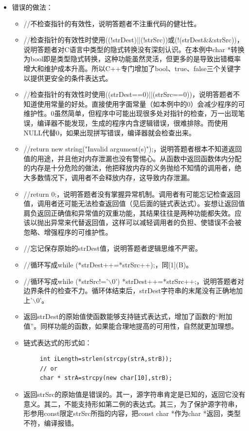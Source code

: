 \documentclass[9pt, b5paper]{article}
\begin{document}
\begin{itemize}
\item 错误的做法：
\begin{itemize}
\item //不检查指针的有效性，说明答题者不注重代码的健壮性。
\item //检查指针的有效性时使用((!strDest)||(!strSrc))或(!(strDest\&\&strSrc))，说明答题者对C语言中类型的隐式转换没有深刻认识。在本例中char *转换为bool即是类型隐式转换，这种功能虽然灵活，但更多的是导致出错概率增大和维护成本升高。所以C++专门增加了bool、true、false三个关键字以提供更安全的条件表达式。
\item //检查指针的有效性时使用((strDest==0)||(strSrc==0))，说明答题者不知道使用常量的好处。直接使用字面常量（如本例中的0）会减少程序的可维护性。0虽然简单，但程序中可能出现很多处对指针的检查，万一出现笔误，编译器不能发现，生成的程序内含逻辑错误，很难排除。而使用NULL代替0，如果出现拼写错误，编译器就会检查出来。
\item //return new string("Invalid argument(s)");，说明答题者根本不知道返回值的用途，并且他对内存泄漏也没有警惕心。从函数中返回函数体内分配的内存是十分危险的做法，他把释放内存的义务抛给不知情的调用者，绝大多数情况下，调用者不会释放内存，这导致内存泄漏。
\item //return 0;，说明答题者没有掌握异常机制。调用者有可能忘记检查返回值，调用者还可能无法检查返回值（见后面的链式表达式）。妄想让返回值肩负返回正确值和异常值的双重功能，其结果往往是两种功能都失效。应该以抛出异常来代替返回值，这样可以减轻调用者的负担、使错误不会被忽略、增强程序的可维护性。
\item //忘记保存原始的strDest值，说明答题者逻辑思维不严密。
\item //循环写成while (*strDest++=*strSrc++);，同[1](B)。
\item //循环写成while (*strSrc!='$\backslash$0') *strDest++=*strSrc++;，说明答题者对边界条件的检查不力。循环体结束后，strDest字符串的末尾没有正确地加上'$\backslash$0'。
\item 返回strDest的原始值使函数能够支持链式表达式，增加了函数的“附加值”。同样功能的函数，如果能合理地提高的可用性，自然就更加理想。
\item 链式表达式的形式如：
\end{itemize}
\begin{verbatim}
        int iLength=strlen(strcpy(strA,strB));
        // or
        char * strA=strcpy(new char[10],strB);
\end{verbatim}
\begin{itemize}
\item 返回strSrc的原始值是错误的。其一，源字符串肯定是已知的，返回它没有意义。其二，不能支持形如第二例的表达式。其三，为了保护源字符串，形参用const限定strSrc所指的内容，把const char *作为char *返回，类型不符，编译报错。
\end{itemize}
\end{itemize}
\end{document}
